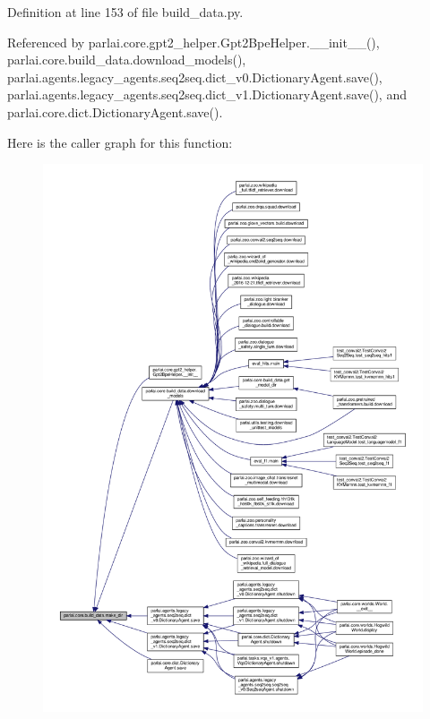 Definition at line 153 of file build\+\_\+data.\+py.



Referenced by parlai.\+core.\+gpt2\+\_\+helper.\+Gpt2\+Bpe\+Helper.\+\_\+\+\_\+init\+\_\+\+\_\+(), parlai.\+core.\+build\+\_\+data.\+download\+\_\+models(), parlai.\+agents.\+legacy\+\_\+agents.\+seq2seq.\+dict\+\_\+v0.\+Dictionary\+Agent.\+save(), parlai.\+agents.\+legacy\+\_\+agents.\+seq2seq.\+dict\+\_\+v1.\+Dictionary\+Agent.\+save(), and parlai.\+core.\+dict.\+Dictionary\+Agent.\+save().

Here is the caller graph for this function\+:
\nopagebreak
\begin{figure}[H]
\begin{center}
\leavevmode
\includegraphics[width=350pt]{namespaceparlai_1_1core_1_1build__data_a6ce042fedd4194bd016845bbe7a8facf_icgraph}
\end{center}
\end{figure}
\mbox{\label{namespaceparlai_1_1core_1_1build__data_a2527e6d29b0ccb7b841182890ac36a59}} 
